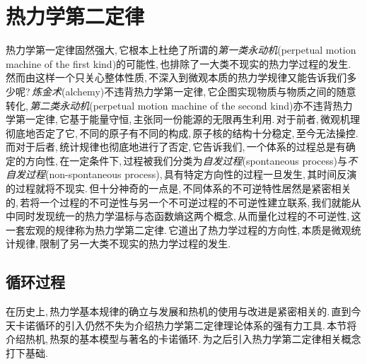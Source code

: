 \chapter{热力学第二定律}

热力学第一定律固然强大,\,它根本上杜绝了所谓的\emph{第一类永动机}(perpetual motion machine of the first kind)的可能性,\,也排除了一大类不现实的热力学过程的发生.\,然而由这样一个只关心整体性质,\,不深入到微观本质的热力学规律又能告诉我们多少呢?\,\emph{炼金术}(alchemy)不违背热力学第一定律,\,它企图实现物质与物质之间的随意转化,\,\emph{第二类永动机}(perpetual motion machine of the second kind)亦不违背热力学第一定律,\,它基于能量守恒,\,主张同一份能源的无限再生利用.\,对于前者,\,微观机理彻底地否定了它,\,不同的原子有不同的构成,\,原子核的结构十分稳定,\,至今无法操控.\,而对于后者,\,统计规律也彻底地进行了否定,\,它告诉我们,\,一个体系的过程总是有确定的方向性,\,在一定条件下,\,过程被我们分类为\emph{自发过程}(spontaneous process)与\emph{不自发过程}(non-spontaneous process),\,具有特定方向性的过程一旦发生,\,其时间反演的过程就将不现实.\,但十分神奇的一点是,\,不同体系的不可逆特性居然是紧密相关的,\,若将一个过程的不可逆性与另一个不可逆过程的不可逆性建立联系,\,我们就能从中同时发现统一的热力学温标与态函数熵这两个概念,\,从而量化过程的不可逆性,\,这一套宏观的规律称为热力学第二定律.\,它道出了热力学过程的方向性,\,本质是微观统计规律,\,限制了另一大类不现实的热力学过程的发生.


\section{循环过程}
在历史上,\,热力学基本规律的确立与发展和热机的使用与改进是紧密相关的.\,直到今天卡诺循环的引入仍然不失为介绍热力学第二定律理论体系的强有力工具.\,本节将介绍热机,\,热泵的基本模型与著名的卡诺循环.\,为之后引入热力学第二定律相关概念打下基础.

